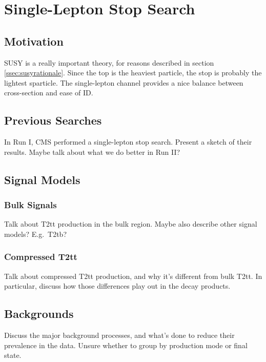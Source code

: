 \chapter{Single-Lepton Stop Search}
\label{chap:stop}

\section{Motivation}
\label{sec:stopmotivation}

SUSY is a really important theory, for reasons described in section \ref{ssec:susyrationale}.
Since the top is the heaviest particle, the stop is probably the lightest sparticle.
The single-lepton channel provides a nice balance between cross-section and ease of ID.

\section{Previous Searches}
\label{sec:stopprun1}

In Run I, CMS performed a single-lepton stop search.
Present a sketch of their results.
Maybe talk about what we do better in Run II?

\section{Signal Models}
\label{sec:stopsigmodels}

\subsection{Bulk Signals}
\label{ssec:stopsigbulk}

Talk about T2tt production in the bulk region.
Maybe also describe other signal models?
E.g.~T2tb?

\subsection{Compressed T2tt}
\label{ssec:stopsigcompressed}

Talk about compressed T2tt production, and why it's different from bulk T2tt.
In particular, discuss how those differences play out in the decay products.

\section{Backgrounds}
\label{sec:stopbkgs}

Discuss the major background processes, and what's done to
reduce their prevalence in the data.
Unsure whether to group by production mode or final state.

